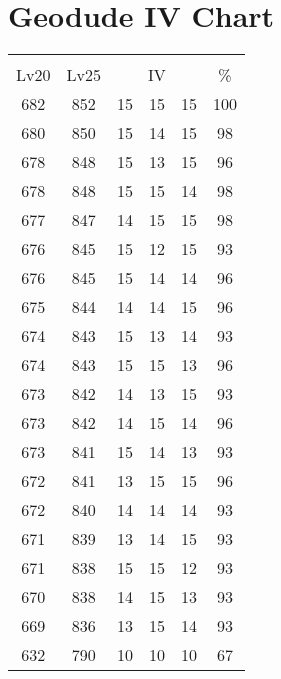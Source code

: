 \documentclass{article}%
\begin{document}
%
\normalsize%
\section{Geodude IV Chart}%
\label{sec:Geodude IV Chart}%
\renewcommand{\arraystretch}{1.5}%
\begin{tabular}{|c|c|c|c|c|c|}%
\hline%
\multicolumn{6}{|c|}{\textcolor{white}{ 
\linebreak{Geodude}
}%
\cellcolor{black}}\\%
\multicolumn{1}{|c}{Lv20}&\multicolumn{1}{c|}{Lv25}&\multicolumn{3}{c|}{IV}&\multicolumn{1}{|c|}{\%}\\%
\hline%
\rowcolor{color100}%
682&852&15&15&15&100\\%
\hline%
\rowcolor{color98}%
680&850&15&14&15&98\\%
\hline%
\rowcolor{color96}%
678&848&15&13&15&96\\%
\hline%
\rowcolor{color98}%
678&848&15&15&14&98\\%
\hline%
\rowcolor{color98}%
677&847&14&15&15&98\\%
\hline%
\rowcolor{color93}%
676&845&15&12&15&93\\%
\hline%
\rowcolor{color96}%
676&845&15&14&14&96\\%
\hline%
\rowcolor{color96}%
675&844&14&14&15&96\\%
\hline%
\rowcolor{color93}%
674&843&15&13&14&93\\%
\hline%
\rowcolor{color96}%
674&843&15&15&13&96\\%
\hline%
\rowcolor{color93}%
673&842&14&13&15&93\\%
\hline%
\rowcolor{color96}%
673&842&14&15&14&96\\%
\hline%
\rowcolor{color93}%
673&841&15&14&13&93\\%
\hline%
\rowcolor{color96}%
672&841&13&15&15&96\\%
\hline%
\rowcolor{color93}%
672&840&14&14&14&93\\%
\hline%
\rowcolor{color93}%
671&839&13&14&15&93\\%
\hline%
\rowcolor{color93}%
671&838&15&15&12&93\\%
\hline%
\rowcolor{color93}%
670&838&14&15&13&93\\%
\hline%
\rowcolor{color93}%
669&836&13&15&14&93\\%
\hline%
\rowcolor{color91}%
632&790&10&10&10&67\\%
\end{tabular}

%
\end{document}
